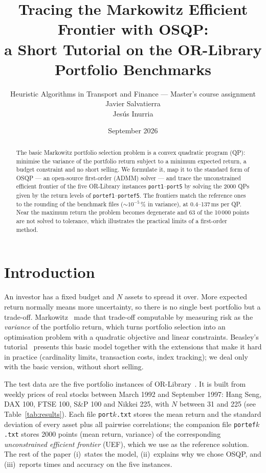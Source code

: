 \documentclass[10pt,a4paper]{article}
\title{\vspace{-1.2cm}\bfseries Tracing the Markowitz Efficient Frontier with OSQP:\\
a Short Tutorial on the OR-Library Portfolio Benchmarks}
\author{Heuristic Algorithms in Transport and Finance --- Master's course assignment \\
    Javier Salvatierra \\
    Jesús Inurria
}
\date{September 2026}
\begin{document}
\maketitle
\vspace{-0.8cm}

\begin{abstract}
\noindent\small
The basic Markowitz portfolio selection problem is a convex quadratic program (QP): minimise the
variance of the portfolio return subject to a minimum expected return, a budget constraint and no
short selling. We formulate it, map it to the standard form of OSQP --- an open-source first-order
(ADMM) solver --- and trace the unconstrained efficient frontier of the five OR-Library instances
\texttt{port1}--\texttt{port5} by solving the 2000 QPs given by the return levels of
\texttt{portef1}--\texttt{portef5}. The frontiers match the reference ones to the rounding of the
benchmark files ($\sim10^{-5}\,\%$ in variance), at 0.4--137\,ms per QP. Near the maximum return the
problem becomes degenerate and 63 of the 10\,000 points are not solved to tolerance, which
illustrates the practical limits of a first-order method.
\end{abstract}

\section{Introduction}

An investor has a fixed budget and $N$ assets to spread it over. More expected return normally means
more uncertainty, so there is no single best portfolio but a trade-off. Markowitz~
made that trade-off computable by measuring risk as the \emph{variance} of the portfolio return, which
turns portfolio selection into an optimisation problem with a quadratic objective and linear
constraints. Beasley's tutorial~\cite{beasley2013} presents this basic model together with the
extensions that make it hard in practice (cardinality limits, transaction costs, index tracking); we
deal only with the basic version, without short selling.

The test data are the five portfolio instances of OR-Library~\cite{orlib}. It is built from weekly prices of real stocks between March 1992 and September
1997: Hang Seng, DAX 100, FTSE 100, S\&P 100 and Nikkei 225, with $N$ between 31 and 225 (see
Table~\ref{tab:results}). Each file \texttt{port$k$.txt} stores the mean return and the standard
deviation of every asset plus all pairwise correlations; the companion file \texttt{portef$k$.txt}
stores 2000 points (mean return, variance) of the corresponding \emph{unconstrained efficient
frontier} (UEF), which we use as the reference solution. The rest of the paper (i)~states the model,
(ii)~explains why we chose OSQP, and (iii)~reports times and accuracy on the five instances.
\end{document}
